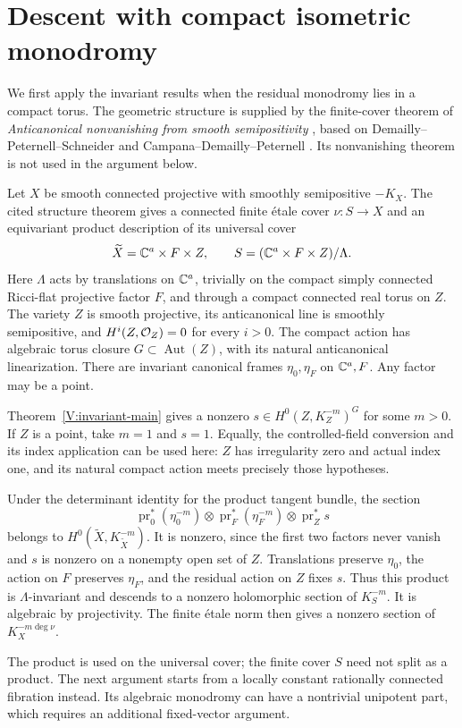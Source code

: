 \section{Descent with compact isometric monodromy}
\label{V:isometric-descent}

We first apply the invariant results when the residual monodromy lies
in a compact torus. The geometric structure is supplied by the
finite-cover theorem of \emph{Anticanonical nonvanishing from smooth semipositivity} \cite[Theorem~2.1]{CompanionH}, based
on Demailly--Peternell--Schneider and Campana--Demailly--Peternell
\cite{DPS1996,CDP2015}. Its nonvanishing theorem is not used in the
argument below.

Let $X$ be smooth connected projective with smoothly semipositive
$-K_X$. The cited structure theorem gives a connected finite \'etale
cover $\nu:S\to X$ and an equivariant product description of its
universal cover
\[
 \widetilde X=\mathbb C^a\times F\times Z,
 \qquad S=(\mathbb C^a\times F\times Z)/\Lambda.
\]
Here $\Lambda$ acts by translations on $\mathbb C^a$, trivially on the
compact simply connected Ricci-flat projective factor $F$, and through
a compact connected real torus on $Z$. The variety $Z$ is smooth
projective, its anticanonical line is smoothly semipositive, and
$H^i(Z,\mathcal O_Z)=0$ for every $i>0$. The compact action has algebraic
torus closure $G\subset\operatorname{Aut}(Z)$, with its natural
anticanonical linearization. There are invariant canonical frames
$\eta_0,\eta_F$ on $\mathbb C^a,F$. Any factor may be a point.

Theorem~\ref{V:invariant-main} gives a nonzero
$s\in H^0(Z,K_Z^{-m})^G$ for some $m>0$. If $Z$ is a point, take
$m=1$ and $s=1$. Equally, the controlled-field conversion and its
index application can be used here: $Z$ has irregularity zero and
actual index one, and its natural compact action meets precisely those
hypotheses.

Under the determinant identity for the product tangent bundle, the
section
\[
 \operatorname{pr}_0^*(\eta_0^{-m})\otimes
 \operatorname{pr}_F^*(\eta_F^{-m})\otimes
 \operatorname{pr}_Z^*s
\]
belongs to $H^0(\widetilde X,K_{\widetilde X}^{-m})$. It is nonzero,
since the first two factors never vanish and $s$ is nonzero on a
nonempty open set of $Z$. Translations preserve $\eta_0$, the action
on $F$ preserves $\eta_F$, and the residual action on $Z$ fixes $s$.
Thus this product is $\Lambda$-invariant and descends to a nonzero
holomorphic section of $K_S^{-m}$. It is algebraic by projectivity.
The finite \'etale norm \cite[Lemma~2.2]{CompanionH}
then gives a nonzero section of $K_X^{-m\deg\nu}$.

The product is used on the universal cover; the finite cover $S$ need
not split as a product. The next argument starts from a locally constant
rationally connected fibration instead. Its algebraic monodromy can
have a nontrivial unipotent part, which requires an additional
fixed-vector argument.
